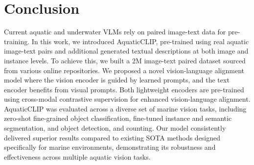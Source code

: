 \section{Conclusion}
\label{sec:conclusion}
\vspace{-1mm}
Current aquatic and underwater VLMs rely on paired image-text data for pre-training.
In this work, we introduced AquaticCLIP, pre-trained using real aquatic image-text pairs and additional generated textual descriptions at both image and instance levels. 
To achieve this, we built a 2M image-text paired dataset sourced from various online repositories. 
We proposed a novel vision-language alignment model where the vision encoder is guided by learned prompts, and the text encoder benefits from visual prompts. 
Both lightweight encoders are pre-trained using cross-modal contrastive supervision for enhanced vision-language alignment.
AquaticCLIP was evaluated across a diverse set of marine vision tasks, including zero-shot fine-grained object classification, fine-tuned instance and semantic segmentation, and object detection, and counting.
Our model consistently delivered superior results compared to existing SOTA methods designed specifically for marine environments, demonstrating its robustness and effectiveness across multiple aquatic vision tasks.




















